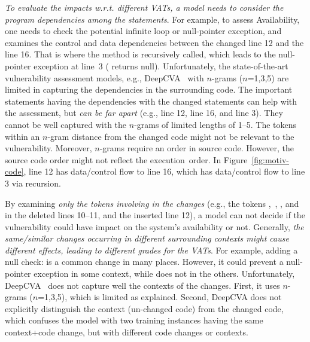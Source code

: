 \vspace{2pt}
  {\em To
  evaluate the impacts w.r.t. different VATs, a model needs to
  consider the program dependencies among the statements}. For
example, to assess Availability, one needs to check the potential
infinite loop or null-pointer exception, and examines the control and
data dependencies between the changed line 12 and the line 16. That is
where the method  is recursively called, which leads to
the null-pointer exception at line~3 (
returns null). Unfortunately, the state-of-the-art vulnerability
assessment models, e.g., DeepCVA~\cite{deepCVA-ase21} with $n$-grams
($n$=1,3,5)
are limited in capturing the dependencies in the surrounding code. The
important statements having the dependencies with the changed
statements can help with the assessment, but {\em can be far apart}
(e.g., line 12, line 16, and line 3). They cannot be well captured
with the $n$-grams of limited lengths of 1--5. The tokens within an
$n$-gram distance from the changed code might not be relevant to the
vulnerability. Moreover, $n$-grams require an order in source
code. However, the source code order might not reflect the execution~order. In Figure~\ref{fig:motiv-code}, line 12 has data/control flow to
line 16, which has data/control flow to line 3 via recursion.


\vspace{1pt}
 By examining {\em only the tokens
involving in the changes} (e.g., the tokens
,~, , and 
in the deleted lines 10--11, and the inserted line 12), a model can
not decide if the vulnerability could have impact on the system's
availability or not.
Generally, {\em the same/similar changes occurring in different
  surrounding contexts might cause different effects, leading to
  different grades for the VATs}. For example, adding a null check:
 is a common change in many places. However, it
could prevent a null-pointer exception in some context, while does not
in the others.
Unfortunately, DeepCVA~\cite{deepCVA-ase21} does not capture well the
contexts of the changes. First, it uses $n$-grams ($n$=1,3,5), which
is limited as explained. Second, DeepCVA does not explicitly
distinguish the context (un-changed code) from the changed code, which
confuses the model with two training instances having the same
context+code change, but with different code
changes or contexts. 


